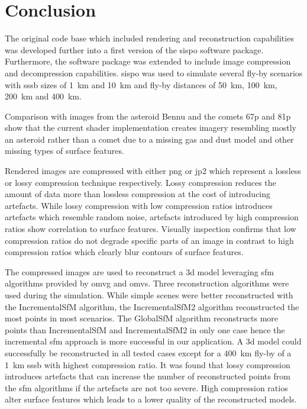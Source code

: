 \section{Conclusion} \label{sec:conclusion}
The original code base which included rendering and reconstruction capabilities was developed further into a first version of the \gls{sispo} software package. Furthermore, the software package was extended to include image compression and decompression capabilities. \Gls{sispo} was used to simulate several fly-by scenarios with \gls{sssb} sizes of \SI{1}{\kilo\meter} and \SI{10}{\kilo\meter} and fly-by distances of \SI{50}{\kilo\meter}, \SI{100}{\kilo\meter}, \SI{200}{\kilo\meter} and \SI{400}{\kilo\meter}.

Comparison with images from the asteroid Bennu and the comets \gls{67p} and \gls{81p} show that the current shader implementation creates imagery resembling mostly an asteroid rather than a comet due to a missing gas and dust model and other missing types of surface features.

Rendered images are compressed with either \gls{png} or \gls{jp2} which represent a lossless or lossy compression technique respectively. Lossy compression reduces the amount of data more than lossless compression at the cost of introducing artefacts. While lossy compression with low compression ratios introduces artefacts which resemble random noise, artefacts introduced by high compression ratios show correlation to surface features. Visually inspection confirms that low compression ratios do not degrade specific parts of an image in contrast to high compression ratios which clearly blur contours of surface features.

The compressed images are used to reconstruct a \gls{3d} model leveraging \gls{sfm} algorithms provided by \gls{omvg} and \gls{omvs}. Three reconstruction algorithms were used during the simulation. While simple scenes were better reconstructed with the IncrementalSfM algorithm, the IncrementalSfM2 algorithm reconstructed the most points in most scenarios. The GlobalSfM algorithm reconstructs more points than IncrementalSfM and IncrementalSfM2 in only one case hence the incremental \gls{sfm} approach is more successful in our application. A \gls{3d} model could successfully be reconstructed in all tested cases except for a \SI{400}{\kilo\meter} fly-by of a \SI{1}{\kilo\meter} \gls{sssb} with highest compression ratio. It was found that lossy compression introduces artefacts that can increase the number of reconstructed points from the \gls{sfm} algorithms if the artefacts are not too severe. High compression ratios alter surface features which leads to a lower quality of the reconstructed models. 

